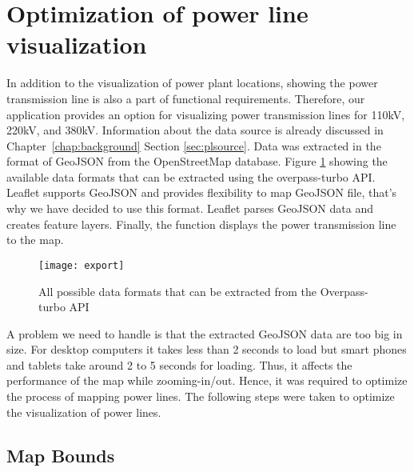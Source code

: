 \section{Optimization of power line visualization}
\label{sec:powerLine}

In addition to the visualization of power plant locations, showing the power transmission line is also a part of functional requirements. Therefore, our application provides an option for visualizing power transmission lines for 110kV, 220kV, and 380kV. Information about the data source is already discussed in Chapter~\ref{chap:background} Section \ref{sec:plsource}. Data was extracted in the format of GeoJSON from the OpenStreetMap database. Figure \ref{fig:export} showing the available data formats that can be extracted using the overpass-turbo API. Leaflet supports GeoJSON and provides flexibility to map GeoJSON file, that's why we have decided to use this format. Leaflet parses GeoJSON data and creates feature layers. Finally, the function displays the power transmission line to the map.

\begin{figure}
\centering
\texttt{[image: export]}
\caption{All possible data formats that can be extracted from the Overpass-turbo API}
\label{fig:export}
\end{figure}

A problem we need to handle is that the extracted GeoJSON data are too big in size. For desktop computers it takes less than 2 seconds to load but smart phones and tablets take around 2 to 5 seconds for loading. Thus, it affects the performance of the map while zooming-in/out. Hence, it was required to optimize the process of mapping power lines. The following steps were taken to optimize the visualization of power lines.

\subsection{Map Bounds}

